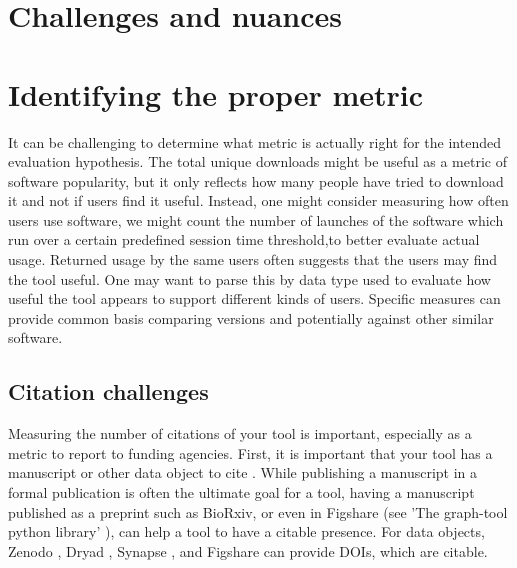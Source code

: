 \documentclass{article}
\begin{document}
\section{Challenges and nuances}

\section{Identifying the proper metric}

 It can be challenging to determine what metric is actually right for the intended evaluation hypothesis. The total unique downloads might be useful as a metric of software popularity, but it only reflects how many people have tried to download it and not if users find it useful. Instead, one might consider measuring how often users use software, we might count the number of launches of the software which run over a certain predefined session time threshold,to better evaluate actual usage. Returned usage by the same users often suggests that the users may find the tool useful. One may want to parse this by data type used to evaluate how useful the tool appears to support different kinds of users.   Specific measures can provide common basis comparing versions and potentially against other similar software. 

\subsection{Citation challenges}
Measuring the number of citations of your tool is important, especially as a metric to report to funding agencies. First, it is important that your tool has a manuscript or other data object to cite \cite{chue_hong_software_2019}. While publishing a manuscript in a formal publication is often the ultimate goal for a tool, having a manuscript published as a preprint such as BioRxiv, or even in Figshare (see 'The graph-tool python library' \cite{peixoto_graph-tool_2017}), can help a tool to have a citable presence. For data objects, Zenodo \cite{zenodo}, Dryad \cite{datadryad}, Synapse \cite{synapse}, and Figshare \cite{figshare} can provide DOIs, which are citable. 
\end{document}
